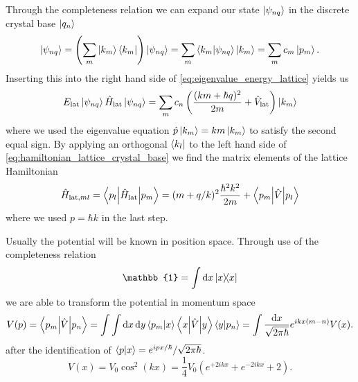 Through the completeness relation we can expand our state $\ket{\psi_{nq}}$
in the discrete crystal base $\ket{q_n}$
\begin{equation}
  \ket{\psi_{nq}}
  =\left(\sum_m\ket{k_m}\bra{k_m}\right)\ket{\psi_{nq}}
  =\sum_m\braket{k_m}{\psi_{nq}}\ket{k_m}
  =\sum_mc_m\ket{p_m}
  \label{eq:state_expansion_crystal_base}.
\end{equation}
Inserting this into the right hand side of
\cref{eq:eigenvalue_energy_lattice} yields us
\begin{equation}
  E_\text{lat}\ket{\psi_{nq}}
  \hat{H}_\text{lat}\ket{\psi_{nq}}
  =\sum_mc_n\left(\frac{(km+\hbar q)^2}{2m}+\hat{V}_\text{lat}\right)\ket{k_m}
  \label{eq:hamiltonian_lattice_crystal_base}
\end{equation}
where we used the eigenvalue equation $\hat{p}\ket{k_m}=km\ket{k_m}$ to
satisfy the second equal sign. By applying an orthogonal $\bra{k_l}$ to the
left hand side of \cref{eq:hamiltonian_lattice_crystal_base} we find
the matrix elements of the lattice Hamiltonian
\begin{equation}
  \hat{H}_{\text{lat},ml}
  =\mel**{p_l}{\hat{H}_\text{lat}}{p_m}
  =(m+q/k)^2\frac{\hbar^2k^2}{2m}+\mel**{p_m}{\hat{V}}{p_l}
  \label{eq:hamiltonian_lattice_element}
\end{equation}
where we used $p=\hbar k$ in the last step.


Usually the potential will be known in position space. Through use of the
completeness relation
\begin{equation}
  \mathbb{1}
  =\int\dd{x}\op{x}{x}
  \label{eq:continous_completeness_relation}
\end{equation}
we are able to transform the potential in momentum space
\begin{equation}
  V(p)
  =\mel**{p_m}{\hat{V}}{p_n}
  =\int\int\dd{x}\dd{y}\braket{p_m}{x}\mel**{x}{\hat{V}}{y}\braket{y}{p_n}
  =\int\frac{\dd{x}}{\sqrt{2\pi\hbar}}e^{ikx(m-n)}V(x)
  \label{eq:potential_fourier_transform}.
\end{equation}
after the identification of $\braket{p}{x}=e^{ipx/\hbar}/\sqrt{2\pi\hbar}$.
\begin{equation}
  V(x)
  =V_0\cos^2(kx)
  =\frac{1}{4}V_0\left(e^{+2ikx}+e^{-2ikx}+2\right)
  \label{eq:potential_dipole_crystal_base}.
\end{equation}

